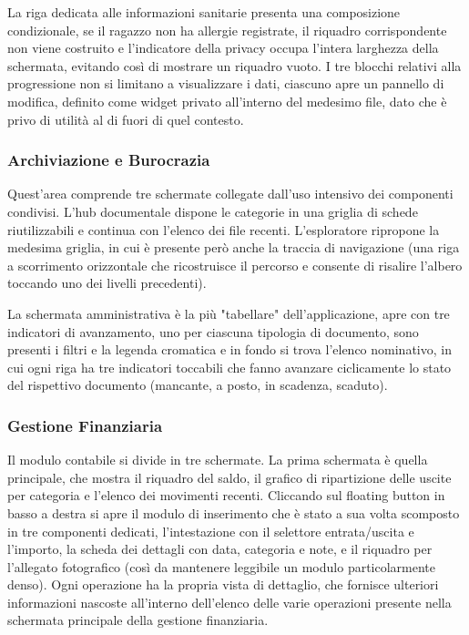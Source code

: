 \documentclass[11pt]{article}
\numberwithin{figure}{section}
\begin{document}
La riga dedicata alle informazioni sanitarie presenta una composizione condizionale, se il ragazzo non ha allergie registrate, il riquadro corrispondente non viene costruito e l'indicatore della privacy occupa l'intera larghezza della schermata, evitando così di mostrare un riquadro vuoto. I tre blocchi relativi alla progressione non si limitano a visualizzare i dati, ciascuno apre un pannello di modifica, definito come widget privato all'interno del medesimo file, dato che è privo di utilità al di fuori di quel contesto.

\subsubsection{Archiviazione e Burocrazia}

Quest'area comprende tre schermate collegate dall'uso intensivo dei componenti condivisi. L'hub documentale dispone le categorie in una griglia di schede riutilizzabili e continua con l'elenco dei file recenti. L'esploratore ripropone la medesima griglia, in cui è presente però anche la traccia di navigazione (una riga a scorrimento orizzontale che ricostruisce il percorso e consente di risalire l'albero toccando uno dei livelli precedenti).

La schermata amministrativa è la più "tabellare" dell'applicazione, apre con tre indicatori di avanzamento, uno per ciascuna tipologia di documento, sono presenti i filtri e la legenda cromatica e in fondo si trova l'elenco nominativo, in cui ogni riga ha tre indicatori toccabili che fanno avanzare ciclicamente lo stato del rispettivo documento (mancante, a posto, in scadenza, scaduto).

\subsubsection{Gestione Finanziaria}

Il modulo contabile si divide in tre schermate. La prima schermata è quella principale, che mostra il riquadro del saldo, il grafico di ripartizione delle uscite per categoria e l'elenco dei movimenti recenti. Cliccando sul floating button in basso a destra si apre il modulo di inserimento che è stato a sua volta scomposto in tre componenti dedicati, l'intestazione con il selettore entrata/uscita e l'importo, la scheda dei dettagli con data, categoria e note, e il riquadro per l'allegato fotografico (così da mantenere leggibile un modulo particolarmente denso). Ogni operazione ha la propria vista di dettaglio, che fornisce ulteriori informazioni nascoste all'interno dell'elenco delle varie operazioni presente nella schermata principale della gestione finanziaria.
\end{document}
